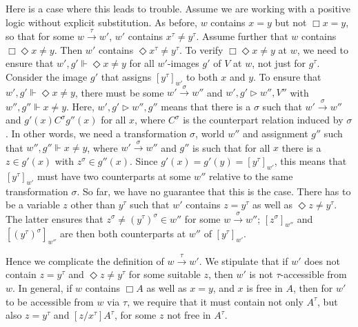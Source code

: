 \documentclass[11pt]{woarticle}
\theoremstyle{break}
\theoremstyle{nonumberplain}
\newcommand{\SAT}{\Vdash}
\newcommand{\Img}{\triangleright}
\newcommand{\1}{\;\,|\;\,}
\begin{document}
Here is a case where this leads to trouble. Assume we are working with a
positive logic without explicit substitution. As before, $w$ contains $x\!=\!y$
but not $\Box x\!=\!y$, so that for some $w\xrightarrow{\tau} w'$, $w'$ contains
$x^\tau\!\not=\!y^\tau$. Assume further that $w$ contains
$\Box\Diamond x\!\not=\!y$. Then $w'$ contains $\Diamond x^\tau\not=\!y^\tau$. To
verify $\Box\Diamond x\!\not=\!y$ at $w$, we need to ensure that
$w',g' \SAT \Diamond x\!\not=\!y$ for all $w'$-images $g'$ of $V$ at $w$, not
just for $g^\tau$. Consider the image $g'$ that assigns $[y^\tau]_{w'}$ to both
$x$ and $y$. To ensure that $w',g' \SAT \Diamond x\!\not=\!y$, there must be
some $w'\xrightarrow{\sigma} w''$ and $w',g'\Img w'',V''$ with
$w'',g'' \SAT x\!\not=\!y$. Here, $w',g' \Img w'',g''$ means that there is a
$\sigma$ such that $w'\xrightarrow{\sigma} w''$ and
$g'(x) C^\sigma g''(x)$ for all $x$, where $C^\sigma$ is the
counterpart relation induced by $\sigma$. In other words, we need a
transformation $\sigma$, world $w''$ and assignment $g''$ such that
$w'',g'' \SAT x\!\not=\!y$, where $w'\xrightarrow{\sigma} w''$ and $g''$ is such
that for all $x$ there is a $z \in g'(x)$ with $z^\sigma \in g''(x)$.
Since $g'(x) = g'(y) = [y^\tau]_{w'}$, this means that $[y^\tau]_{w'}$
must have two counterparts at some $w''$ relative to the same transformation
$\sigma$. So far, we have no guarantee that this is the case. There has to
be a variable $z$ other than $y^\tau$ such that $w'$ contains $z\!=\!y^\tau$ as
well as $\Diamond z\!\not=\!y^\tau$. The latter ensures that
$z^\sigma\!\not=\!(y^{\tau})^\sigma \in w''$ for some
$w \xrightarrow{\sigma} w''$; $[z^\sigma]_{w''}$ and $[(y^{\tau})^\sigma]_{w''}$
are then both counterparts at $w''$ of $[y^\tau]_{w'}$.

Hence we complicate the definition of $w \xrightarrow{\tau} w'$. We stipulate
that if $w'$ does not contain $z\!=\!y^\tau$ and $\Diamond z\!\not=\!y^\tau$ for
some suitable $z$, then $w'$ is not $\tau$-accessible from $w$. In general, if
$w$ contains $\Box A$ as well as $x\!=\!y$, and $x$ is free in $A$, then for
$w'$ to be accessible from $w$ via $\tau$, we require that it must contain not
only $A^\tau$, but also $z\!=\!y^\tau$ and $[z/x^\tau]A^\tau$, for some $z$ not
free in $A^\tau$.
\end{document}
